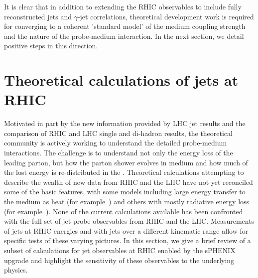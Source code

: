 
It is clear that in addition to extending the RHIC observables to
include fully reconstructed jets and $\gamma$-jet correlations,
theoretical development work is required for converging to a coherent
'standard model' of the medium coupling strength and the nature of the
probe-medium interaction.  In the next section, we detail positive
steps in this direction.


\section{Theoretical calculations of jets at RHIC}
\label{sec:jetcalculations}

Motivated in part by the new information provided by LHC jet results
and the comparison of RHIC and LHC single and di-hadron results, the
theoretical community is actively working to understand the detailed
probe-medium interactions.  The challenge is to understand not only
the energy loss of the leading parton, but how the parton shower
evolves in medium and how much of the lost energy is re-distributed in
the \qgp.  Theoretical calculations attempting to describe the wealth
of new data from RHIC and the LHC have not yet reconciled some of the
basic features, with some models including large energy transfer to
the medium as heat (for example~\cite{CasalderreySolana:2011rq}) and
others with mostly radiative energy loss (for
example~\cite{Renk:2012cb,Renk:2011wb}).  None of the current
calculations available has been confronted with the full set of jet
probe observables from RHIC and the LHC.  Measurements of jets at RHIC
energies and with jets over a different kinematic range allow for
specific tests of these varying pictures.  In this section, we give a
brief review of a subset of calculations for jet observables at RHIC
enabled by the sPHENIX upgrade and highlight the sensitivity of these
observables to the underlying physics.

